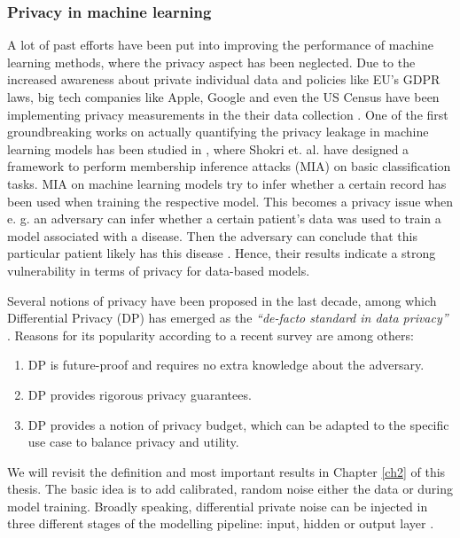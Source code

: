 \subsubsection*{Privacy in machine learning}
A lot of past efforts have been put into improving the performance of machine learning methods, where the privacy aspect has been neglected. Due to the increased awareness about private individual data and policies like EU's GDPR laws, big tech companies like Apple, Google and even the US Census have been implementing privacy measurements in the their data collection \parencite[see][]{dwork2019differential,abowd2019census}. One of the first groundbreaking works on actually quantifying the privacy leakage in machine learning models has been studied in \parencite{shokri2017membership}, where Shokri et. al. have designed a framework to perform membership inference attacks (MIA) on basic classification tasks. MIA on machine learning models try to infer whether a certain record has been used when training the respective model. This becomes a privacy issue when e. g. an adversary can infer whether a certain patient's data was used to train a model associated with a disease. Then the adversary can conclude that this particular patient likely has this disease \parencite[cf.][p. 5]{shokri2017membership}. Hence, their results indicate a strong vulnerability in terms of privacy for data-based models.


Several notions of privacy have been proposed in the last decade, among which Differential Privacy (DP) has emerged as the \textit{``de-facto standard in data privacy''} \parencite{kim2021survey}. Reasons for its popularity according to a recent survey \parencite{surv_dp2021} are among others:

\begin{enumerate}
    \item DP is future-proof and requires no extra knowledge about the adversary.
    \item DP provides rigorous privacy guarantees.
    \item DP provides a notion of privacy budget, which can be adapted to the specific use case to balance privacy and utility.
\end{enumerate}

We will revisit the definition and most important results in Chapter \ref{ch2} of this thesis. The basic idea is to add calibrated, random noise either the data or during model training. Broadly speaking, differential private noise can be injected in three different stages of the modelling pipeline: input, hidden or output layer \parencite[cf.][]{zhao2019differential}. 

